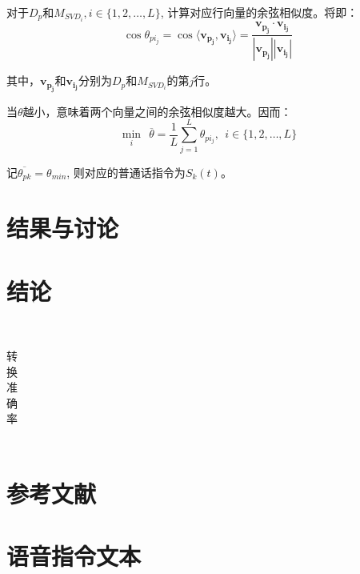 \documentclass[lang=cn,cite=super]{elegantpaper}
\begin{document}
对于$D_p$和$M_{SVD_i}, i \in \{ 1,2,\ldots, L\}$, 计算对应行向量的余弦相似度。将即：
\begin{equation}
    \cos \theta_{pi_{j}} = \cos \langle \bm{v_{p_j}},\bm{v_{i_j}} \rangle = \frac{\bm{v_{p_j}} \cdot \bm{v_{i_j}}}{|\bm{v_{p_j}}||\bm{v_{i_j}}|}
\end{equation}

其中，$\bm{v_{p_j}}$和$\bm{v_{i_j}}$分别为$D_p$和$M_{SVD_i}$的第$j$行。

当$\theta$越小，意味着两个向量之间的余弦相似度越大。因而：
\begin{equation}
    \mathop{\min}_{i} ~~\overline{\theta} = \dfrac{1}{L} \sum_{j=1}^{L} \theta_{pi_{j}}, ~~i \in \{1,2,\ldots, L\}
\end{equation}

记$\overline{\theta_{pk}} = \theta_{min}$, 则对应的普通话指令为$S_k(t)$。
\section{结果与讨论}


\section{结论}
\begin{table}[h]
    \caption{\label{tab:3} 转换准确率}\
    \begin{center}
        \begin{tabular}{cc}
            \hline
            \hline
        \end{tabular}
    \end{center}
\end{table}
\begin{equation}
\end{equation}
\section{参考文献}
\appendix
\section{语音指令文本}
\label{appendix:A}
\end{document}

